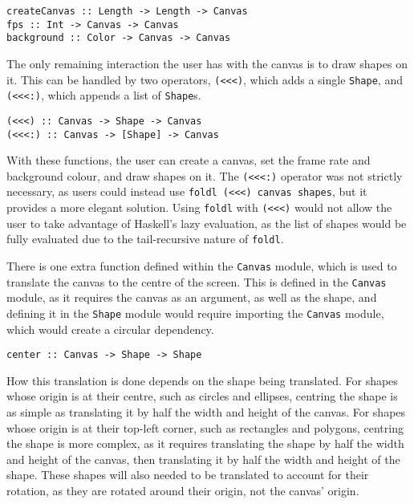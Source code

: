 \documentclass[../main.tex]{subfiles}
\begin{document}
        \begin{lstlisting}[label={lst:fps}, caption={The \texttt{createCanvas}, \texttt{fps} and \texttt{backgrounds} functions.}]
createCanvas :: Length -> Length -> Canvas
fps :: Int -> Canvas -> Canvas
background :: Color -> Canvas -> Canvas\end{lstlisting}

        The only remaining interaction the user has with the canvas is to draw shapes
            on it.
        This can be handled by two operators, \texttt{(<<<)}, which adds a single
            \texttt{Shape}, and \texttt{(<<<:)}, which appends a list of \texttt{Shape}s.

        \begin{lstlisting}[label={lst:<<<}, caption={The operators to append a frame to the canvas.}]
(<<<) :: Canvas -> Shape -> Canvas
(<<<:) :: Canvas -> [Shape] -> Canvas\end{lstlisting}

        With these functions, the user can create a canvas, set the frame rate and
            background colour, and draw shapes on it.
        The \texttt{(<<<:)} operator was not strictly necessary, as users could instead
            use \texttt{foldl (<<<) canvas shapes}, but it provides a more elegant
            solution.
        Using \texttt{foldl} with \texttt{(<<<)} would not allow the user to take
            advantage of Haskell's lazy evaluation, as the list of shapes would be fully
            evaluated due to the tail-recursive nature of \texttt{foldl}.

        There is one extra function defined within the \texttt{Canvas} module, which is
            used to translate the canvas to the centre of the screen.
        This is defined in the \texttt{Canvas} module, as it requires the canvas as an
            argument, as well as the shape, and defining it in the \texttt{Shape} module
            would require importing the \texttt{Canvas} module, which would create a
            circular dependency.

        \begin{lstlisting}[label={lst:centre}, caption={The \texttt{centre} function.}]
center :: Canvas -> Shape -> Shape\end{lstlisting}

        How this translation is done depends on the shape being translated.
        For shapes whose origin is at their centre, such as circles and ellipses,
            centring the shape is as simple as translating it by half the width and height
            of the canvas.
        For shapes whose origin is at their top-left corner, such as rectangles and
            polygons, centring the shape is more complex, as it requires translating the
            shape by half the width and height of the canvas, then translating it by half
            the width and height of the shape.
        These shapes will also needed to be translated to account for their rotation,
            as they are rotated around their origin, not the canvas' origin.
\end{document}
